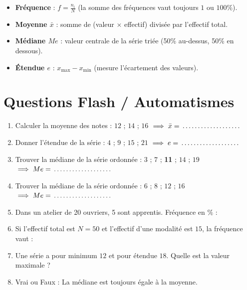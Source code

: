\begin{cadreretenu}
\begin{itemize}[leftmargin=1.5em, itemsep=2pt]
    \item \textbf{Fréquence} : $f = \frac{n_i}{N}$ (la somme des fréquences vaut toujours $1$ ou $100\%$).
    \item \textbf{Moyenne $\bar{x}$} : somme de (valeur $\times$ effectif) divisée par l'effectif total.
    \item \textbf{Médiane $Me$} : valeur centrale de la série triée (50\% au-dessus, 50\% en dessous).
    \item \textbf{Étendue $e$} : $x_{\text{max}} - x_{\text{min}}$ (mesure l'écartement des valeurs).
\end{itemize}
\end{cadreretenu}

\section{Questions Flash / Automatismes}

\begin{automatisme}
\begin{enumerate}[label=\textbf{Q\arabic*.}]
    \item Calculer la moyenne des notes : $12$ ; $14$ ; $16$ $\implies \bar{x} = \pointille[3cm]$
    \item Donner l'étendue de la série : $4$ ; $9$ ; $15$ ; $21$ $\implies e = \pointille[3cm]$
    \item Trouver la médiane de la série ordonnée : $3$ ; $7$ ; \textbf{11} ; $14$ ; $19$ $\implies Me = \pointille[3cm]$
    \item Trouver la médiane de la série ordonnée : $6$ ; $8$ ; $12$ ; $16$ $\implies Me = \pointille[3cm]$
    \item Dans un atelier de 20 ouvriers, 5 sont apprentis. Fréquence en $\%$ : \pointille[3cm]
    \item Si l'effectif total est $N = 50$ et l'effectif d'une modalité est $15$, la fréquence vaut : \pointille[3cm]
    \item Une série a pour minimum $12$ et pour étendue $18$. Quelle est la valeur maximale ? \pointille[3cm]
    \item Vrai ou Faux : La médiane est toujours égale à la moyenne. \pointille[3cm]
\end{enumerate}
\end{automatisme}

